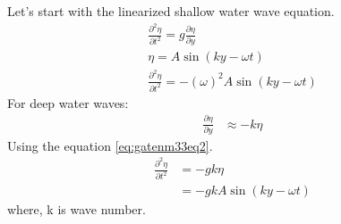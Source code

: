 \documentclass[journal,12pt,onecolumn]{IEEEtran}
\theoremstyle{remark}
\begin{document}
Let's start with the linearized shallow water wave equation.\\
\begin{align}
\frac{\partial^2 \eta}{\partial t^2}=g \frac{\partial \eta}{\partial y}\label{eq:gatenm33eq2}\\
\eta = A\sin(ky - \omega t) \label{eq:gatenm33eq3} \\
\frac{\partial^2 \eta}{\partial t^2} = -(\omega)^2 A\sin(ky - \omega t) \label{eq:gatenm33eq4}
\end{align}
For deep water waves:\\ 
\begin{align}
\frac{\partial \eta}{\partial y} &\approx -k\eta \label{eq:gatenm33eq5}
\end{align}
Using the equation \eqref{eq:gatenm33eq2}.
\begin{align}
\frac{\partial^2 \eta}{\partial t^2}&=-gk\eta \label{eq:gatenm33eq6}\\
&=-gk A\sin(ky - \omega t) \label{eq:gatenm33eq7}
\end{align}
where, k is wave number. \\
\end{document}
